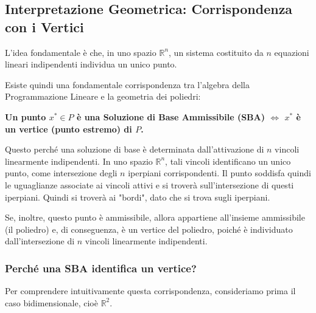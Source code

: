 \subsection{Interpretazione Geometrica: Corrispondenza con i Vertici}

L'idea fondamentale è che, in uno spazio $\mathbb{R}^n$, un sistema costituito da $n$ equazioni lineari indipendenti individua un unico punto.

Esiste quindi una fondamentale corrispondenza tra l'algebra della Programmazione Lineare e la geometria dei poliedri:

\begin{center}
\textbf{Un punto $x^* \in P$ è una Soluzione di Base Ammissibile (SBA) $\iff$ $x^*$ è un vertice (punto estremo) di $P$.}
\end{center}

Questo perché una soluzione di base è determinata dall'attivazione di \(n\) vincoli linearmente indipendenti. In uno spazio \(\mathbb{R}^n\), tali vincoli identificano un unico punto, come intersezione degli \(n\) iperpiani corrispondenti. Il punto soddisfa quindi le uguaglianze associate ai vincoli attivi e si troverà sull'intersezione di questi iperpiani.
Quindi si troverà ai "bordi", dato che si trova sugli iperpiani.

Se, inoltre, questo punto è ammissibile, allora appartiene all'insieme ammissibile (il poliedro) e, di conseguenza, è un vertice del poliedro, poiché è individuato dall'intersezione di \(n\) vincoli linearmente indipendenti.

\subsubsection{Perché una SBA identifica un vertice?}

Per comprendere intuitivamente questa corrispondenza, consideriamo prima il caso bidimensionale, cioè $\mathbb{R}^2$.

